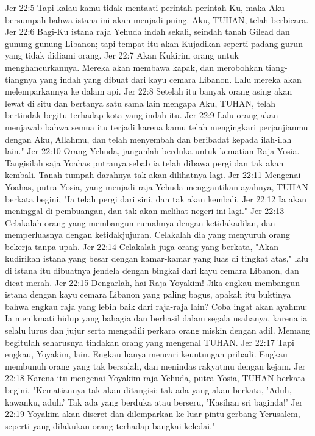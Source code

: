 Jer 22:5  Tapi kalau kamu tidak mentaati perintah-perintah-Ku, maka Aku bersumpah bahwa istana ini akan menjadi puing. Aku, TUHAN, telah berbicara.
Jer 22:6  Bagi-Ku istana raja Yehuda indah sekali, seindah tanah Gilead dan gunung-gunung Libanon; tapi tempat itu akan Kujadikan seperti padang gurun yang tidak didiami orang.
Jer 22:7  Akan Kukirim orang untuk menghancurkannya. Mereka akan membawa kapak, dan merobohkan tiang-tiangnya yang indah yang dibuat dari kayu cemara Libanon. Lalu mereka akan melemparkannya ke dalam api.
Jer 22:8  Setelah itu banyak orang asing akan lewat di situ dan bertanya satu sama lain mengapa Aku, TUHAN, telah bertindak begitu terhadap kota yang indah itu.
Jer 22:9  Lalu orang akan menjawab bahwa semua itu terjadi karena kamu telah mengingkari perjanjianmu dengan Aku, Allahmu, dan telah menyembah dan beribadat kepada ilah-ilah lain."
Jer 22:10  Orang Yehuda, janganlah berduka untuk kematian Raja Yosia. Tangisilah saja Yoahas putranya sebab ia telah dibawa pergi dan tak akan kembali. Tanah tumpah darahnya tak akan dilihatnya lagi.
Jer 22:11  Mengenai Yoahas, putra Yosia, yang menjadi raja Yehuda menggantikan ayahnya, TUHAN berkata begini, "Ia telah pergi dari sini, dan tak akan kembali.
Jer 22:12  Ia akan meninggal di pembuangan, dan tak akan melihat negeri ini lagi."
Jer 22:13  Celakalah orang yang membangun rumahnya dengan ketidakadilan, dan memperluasnya dengan ketidakjujuran. Celakalah dia yang menyuruh orang bekerja tanpa upah.
Jer 22:14  Celakalah juga orang yang berkata, "Akan kudirikan istana yang besar dengan kamar-kamar yang luas di tingkat atas," lalu di istana itu dibuatnya jendela dengan bingkai dari kayu cemara Libanon, dan dicat merah.
Jer 22:15  Dengarlah, hai Raja Yoyakim! Jika engkau membangun istana dengan kayu cemara Libanon yang paling bagus, apakah itu buktinya bahwa engkau raja yang lebih baik dari raja-raja lain? Coba ingat akan ayahmu: Ia menikmati hidup yang bahagia dan berhasil dalam segala usahanya, karena ia selalu lurus dan jujur serta mengadili perkara orang miskin dengan adil. Memang begitulah seharusnya tindakan orang yang mengenal TUHAN.
Jer 22:17  Tapi engkau, Yoyakim, lain. Engkau hanya mencari keuntungan pribadi. Engkau membunuh orang yang tak bersalah, dan menindas rakyatmu dengan kejam.
Jer 22:18  Karena itu mengenai Yoyakim raja Yehuda, putra Yosia, TUHAN berkata begini, "Kematiannya tak akan ditangisi; tak ada yang akan berkata, 'Aduh, kawanku, aduh.' Tak ada yang berduka atau berseru, 'Kasihan sri baginda!'
Jer 22:19  Yoyakim akan diseret dan dilemparkan ke luar pintu gerbang Yerusalem, seperti yang dilakukan orang terhadap bangkai keledai."
